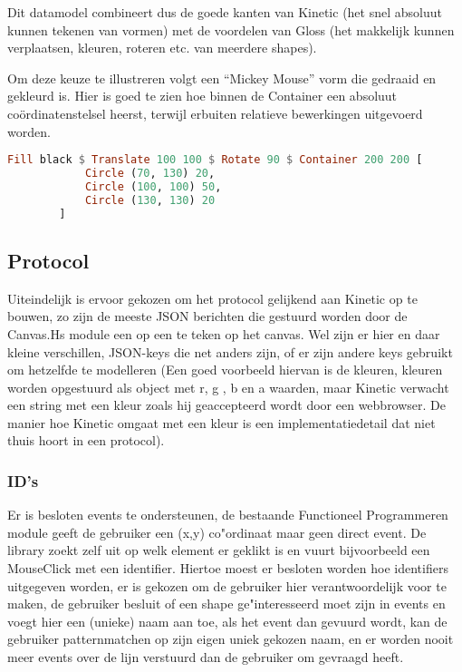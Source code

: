 Dit datamodel combineert dus de goede kanten van Kinetic (het snel absoluut kunnen tekenen van vormen) met de voordelen van Gloss (het makkelijk kunnen verplaatsen, kleuren, roteren etc. van meerdere shapes).

Om deze keuze te illustreren volgt een ``Mickey Mouse'' vorm die gedraaid en gekleurd is. Hier is goed te zien hoe binnen de Container een absoluut co\"ordinatenstelsel heerst, terwijl erbuiten relatieve bewerkingen uitgevoerd worden.

\begin{lstlisting}[style=densecode, language=Haskell]
Fill black $ Translate 100 100 $ Rotate 90 $ Container 200 200 [
            Circle (70, 130) 20,
            Circle (100, 100) 50,
            Circle (130, 130) 20
        ]
\end{lstlisting}

\subsection{Protocol}
Uiteindelijk is ervoor gekozen om het protocol gelijkend aan Kinetic op te bouwen, zo zijn de meeste JSON berichten die gestuurd worden door de Canvas.Hs module een op een te teken op het canvas. Wel zijn er hier en daar kleine verschillen, JSON-keys die net anders zijn, of er zijn andere keys gebruikt om hetzelfde te modelleren (Een goed voorbeeld hiervan is de kleuren, kleuren worden opgestuurd als object met r, g , b en a waarden, maar Kinetic verwacht een string met een kleur zoals hij geaccepteerd wordt door een webbrowser. De manier hoe Kinetic omgaat met een kleur is een implementatiedetail dat niet thuis hoort in een protocol).

\subsubsection{ID's}
Er is besloten events te ondersteunen, de bestaande Functioneel Programmeren module geeft de gebruiker een (x,y) co"ordinaat maar geen direct event. De library zoekt zelf uit op welk element er geklikt is en vuurt bijvoorbeeld een MouseClick met een identifier. Hiertoe moest er besloten worden hoe identifiers uitgegeven worden, er is gekozen om de gebruiker hier verantwoordelijk voor te maken, de gebruiker besluit of een shape ge"interesseerd moet zijn in events en voegt hier een (unieke) naam aan toe, als het event dan gevuurd wordt, kan de gebruiker patternmatchen op zijn eigen uniek gekozen naam, en er worden nooit meer events over de lijn verstuurd dan de gebruiker om gevraagd heeft.

